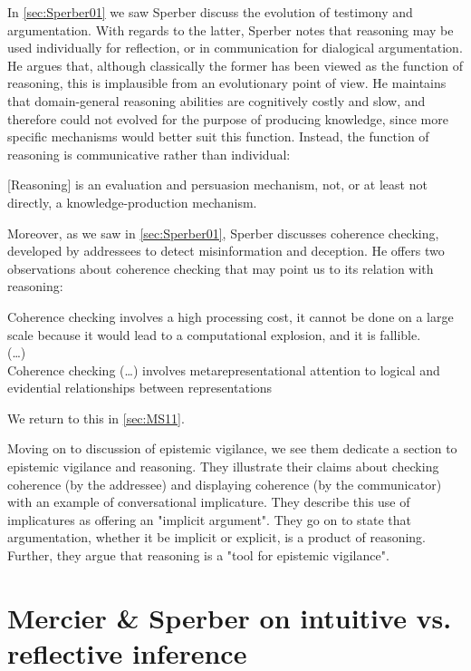 In \cref{sec:Sperber01} we saw Sperber discuss the evolution of testimony and argumentation. With regards to the latter, Sperber notes that reasoning may be used individually for reflection, or in communication for dialogical argumentation. He argues that, although classically the former has been viewed as the function of reasoning, this is implausible from an evolutionary point of view. He maintains that domain-general reasoning abilities are cognitively costly and slow, and therefore could not evolved for the purpose of producing knowledge, since more specific mechanisms would better suit this function. Instead, the function of reasoning is communicative rather than individual:
\begin{quoting}
    {[Reasoning]} is an evaluation and persuasion mechanism, not, or at least not directly, a knowledge-production mechanism.
    \hfill \citep[p.~409]{Sperber01}
\end{quoting}
Moreover, as we saw in \cref{sec:Sperber01}, Sperber discusses coherence checking, developed by addressees to detect misinformation and deception. He offers two observations about coherence checking that may point us to its relation with reasoning:
\begin{quoting}
    Coherence checking involves a high processing cost, it cannot be done on a large scale because it would lead to a computational explosion, and it is fallible.
    \\ (\ldots) \\
    Coherence checking (\ldots) involves metarepresentational attention to logical and evidential relationships between representations
    \hfill \citep[p.~410]{Sperber01}
\end{quoting}
We return to this in \cref{sec:MS11}.

Moving on to  discussion of epistemic vigilance, we see them dedicate a section to epistemic vigilance and reasoning. They illustrate their claims about checking coherence (by the addressee) and displaying coherence (by the communicator) with an example of conversational implicature. They describe this use of implicatures as offering an "implicit argument".
They go on to state that argumentation, whether it be implicit or explicit, is a product of reasoning. Further, they argue that reasoning is a "tool for epistemic vigilance".

\section{Mercier \& Sperber on intuitive vs. reflective inference}
\label{sec:MS09}

